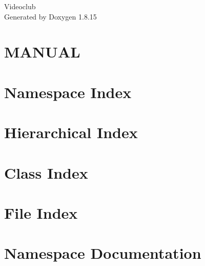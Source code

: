 \let\mypdfximage\pdfximage\def\pdfximage{\immediate\mypdfximage}\documentclass[twoside]{book}
\newcommand{\+}{\discretionary{\mbox{\scriptsize$\hookleftarrow$}}{}{}}
\newcommand{\clearemptydoublepage}{%
  \newpage{\pagestyle{empty}\cleardoublepage}%
}
\begin{document}
\hypersetup{pageanchor=false,
             bookmarksnumbered=true,
             pdfencoding=unicode
            }
\begin{titlepage}
\vspace*{7cm}
\begin{center}%
{\Large Videoclub }\\
\vspace*{1cm}
{\large Generated by Doxygen 1.8.15}\\
\end{center}
\end{titlepage}
\clearemptydoublepage
{}
\tableofcontents
\clearemptydoublepage
{}
\hypersetup{pageanchor=true}

\chapter{M\+A\+N\+U\+AL}
\label{md_src_docs__r_e_a_d_m_e}

\chapter{Namespace Index}

\chapter{Hierarchical Index}

\chapter{Class Index}

\chapter{File Index}

\chapter{Namespace Documentation}


















\end{document}
